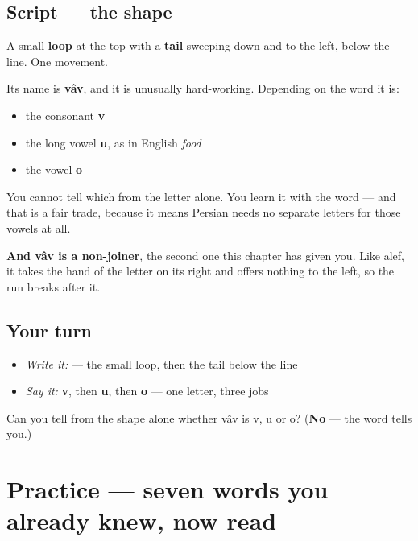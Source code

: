 \subsection*{Script — the shape}

\begin{quote}
\end{quote}

A small \textbf{loop} at the top with a \textbf{tail} sweeping down and to the left, below the line. One movement.

Its name is \textbf{vâv}, and it is unusually hard-working. Depending on the word it is:

\begin{itemize}
\raggedright
  \item the consonant \textbf{v}
  \item the long vowel \textbf{u}, as in English \emph{food}
  \item the vowel \textbf{o}
\end{itemize}

You cannot tell which from the letter alone. You learn it with the word — and that is a fair trade, because it means Persian needs no separate letters for those vowels at all.

\textbf{And vâv is a non-joiner}, the second one this chapter has given you. Like alef, it takes the hand of the letter on its right and offers nothing to the left, so the run breaks after it.

\subsection*{Your turn}
\begin{itemize}
\raggedright
  \item \emph{Write it:}  — the small loop, then the tail below the line
  \item \emph{Say it:} \textbf{v}, then \textbf{u}, then \textbf{o} — one letter, three jobs
\end{itemize}

\begin{tcolorbox}[breakable,colback=teal!4,colframe=teal!35!black,title={Before you move on}]
Can you tell from the shape alone whether vâv is v, u or o? (\textbf{No} — the word tells you.)
\end{tcolorbox}
\section[Practice]{Practice — seven words you already knew, now read}

